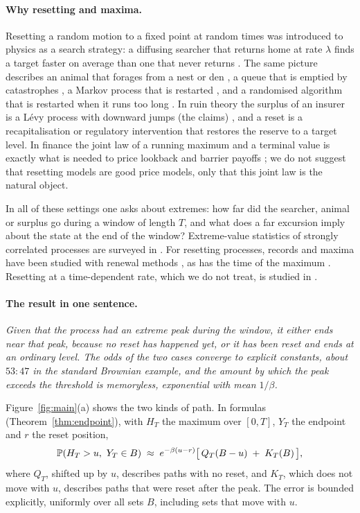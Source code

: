 \documentclass[11pt,a4paper]{article}
\begin{document}
\paragraph{Why resetting and maxima.}
Resetting a random motion to a fixed point at random times was introduced to physics as a search strategy: a diffusing searcher that returns home at rate $\lambda$ finds a target faster on average than one that never returns \cite{EM2011,EMS2020}. The same picture describes an animal that forages from a nest or den \cite{PKR2020}, a queue that is emptied by catastrophes \cite{DGNR2003}, a Markov process that is restarted \cite{APZ2013}, and a randomised algorithm that is restarted when it runs too long \cite{LSZ1993}. In ruin theory the surplus of an insurer is a L\'evy process with downward jumps (the claims) \cite{AA2010,Kyp2014}, and a reset is a recapitalisation or regulatory intervention that restores the reserve to a target level. In finance the joint law of a running maximum and a terminal value is exactly what is needed to price lookback and barrier payoffs \cite{GSG1979}; we do not suggest that resetting models are good price models, only that this joint law is the natural object.

In all of these settings one asks about extremes: how far did the searcher, animal or surplus go during a window of length $T$, and what does a far excursion imply about the state at the end of the window? Extreme-value statistics of strongly correlated processes are surveyed in \cite{MPS2020}. For resetting processes, records and maxima have been studied with renewal methods \cite{SP2021,MMSS2022}, as has the time of the maximum \cite{MMS2021}. Resetting at a time-dependent rate, which we do not treat, is studied in \cite{PKE2016}.

\paragraph{The result in one sentence.}
\emph{Given that the process had an extreme peak during the window, it either ends near that peak, because no reset has happened yet, or it has been reset and ends at an ordinary level. The odds of the two cases converge to explicit constants, about $53:47$ in the standard Brownian example, and the amount by which the peak exceeds the threshold is memoryless, exponential with mean $1/\beta$.}

Figure~\ref{fig:main}(a) shows the two kinds of path. In formulas (Theorem~\ref{thm:endpoint}), with $H_T$ the maximum over $[0,T]$, $Y_T$ the endpoint and $r$ the reset position,
\begin{equation}\label{eq:informal}
 \mathbb P(H_T>u,\ Y_T\in B)\;\approx\;e^{-\beta(u-r)}\big[\,Q_T(B-u)\;+\;K_T(B)\,\big],
\end{equation}
where $Q_T$, shifted up by $u$, describes paths with no reset, and $K_T$, which does not move with $u$, describes paths that were reset after the peak. The error is bounded explicitly, uniformly over all sets $B$, including sets that move with $u$.
\end{document}
